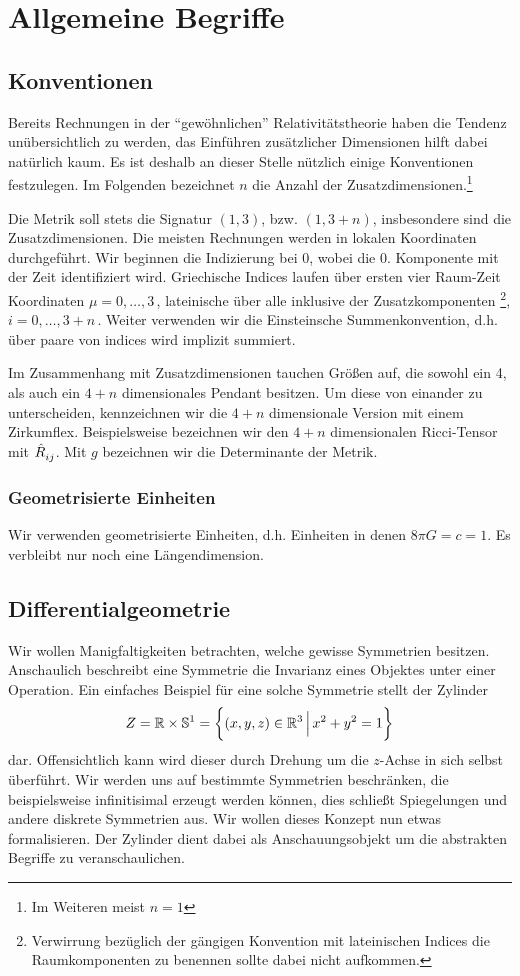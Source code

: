 \chapter{Allgemeine Begriffe}
 
\section{Konventionen}
Bereits Rechnungen in der "`gewöhnlichen"' Relativitätstheorie haben die Tendenz
unübersichtlich zu werden, das Einführen zusätzlicher Dimensionen hilft dabei
natürlich kaum.
Es ist deshalb an dieser Stelle nützlich einige Konventionen festzulegen. Im
Folgenden bezeichnet $n$ die Anzahl der Zusatzdimensionen.\footnote{Im Weiteren
meist $n=1$}

Die Metrik soll stets die Signatur $(1,3)$, bzw. $(1,3+n)$, insbesondere sind
die Zusatzdimensionen. Die meisten Rechnungen werden in lokalen Koordinaten
durchgeführt.
Wir beginnen die Indizierung bei 0, wobei die 0. Komponente mit der Zeit identifiziert wird.
Griechische Indices laufen über ersten vier Raum-Zeit Koordinaten
$\mu=0,\ldots,3\,$, lateinische über alle inklusive der
Zusatzkomponenten \footnote{Verwirrung bezüglich der gängigen Konvention
mit lateinischen Indices die Raumkomponenten zu benennen sollte dabei nicht
aufkommen.}, $i=0,\ldots,3+n\,$. Weiter verwenden wir die Einsteinsche
Summenkonvention, d.h. über paare von indices wird implizit summiert.

Im Zusammenhang mit Zusatzdimensionen tauchen Größen auf, die sowohl ein 4, als
auch ein $4+n$ dimensionales Pendant besitzen. Um diese von einander zu
unterscheiden, kennzeichnen wir die $4+n$ dimensionale Version mit einem
Zirkumflex. 
Beispielsweise bezeichnen wir den $4+n$ dimensionalen Ricci-Tensor mit
$\tensor{\hat{R}}{_i_j}$. Mit $g$ bezeichnen wir die Determinante der Metrik.
\subsection*{Geometrisierte Einheiten}
Wir verwenden geometrisierte Einheiten, d.h. Einheiten in denen
$8\pi G=c=1$. Es verbleibt nur noch eine Längendimension.
\section{Differentialgeometrie}
Wir wollen Manigfaltigkeiten betrachten, welche gewisse Symmetrien besitzen.
Anschaulich beschreibt eine Symmetrie die Invarianz eines Objektes unter einer
Operation.
Ein einfaches Beispiel für eine solche Symmetrie stellt der Zylinder
\begin{equation}
Z=\Reals\times\Sphere^1=\left\{(x,y,z)\in\Reals^3\,\Big|\,x^2+y^2=1\right\} 
\end{equation}
dar. Offensichtlich kann wird dieser durch Drehung um die $z$-Achse in sich
selbst überführt. 
Wir werden uns auf bestimmte Symmetrien beschränken, die
beispielsweise infinitisimal erzeugt werden können, dies schließt Spiegelungen
und andere diskrete Symmetrien aus.
Wir wollen dieses Konzept nun etwas formalisieren. Der Zylinder dient dabei als
Anschauungsobjekt um die abstrakten Begriffe zu veranschaulichen.
